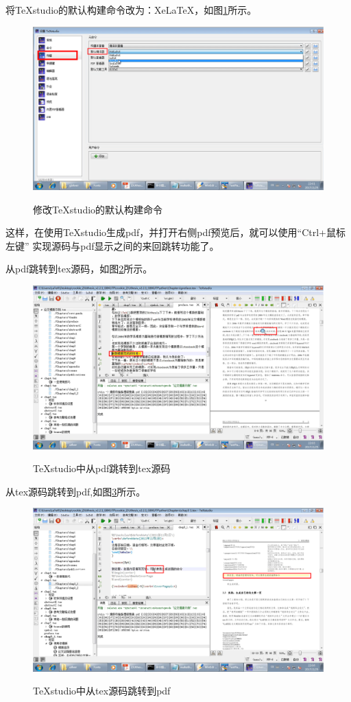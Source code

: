 将TeXstudio的默认构建命令改为：XeLaTeX，如图\ref{Construct}所示。

\begin{figure}[th]
	\centering
	\includegraphics[width=\textwidth]{./Pictures/Construct.eps}\\
	\caption{修改TeXstudio的默认构建命令}
	\label{Construct}
\end{figure}

这样，在使用TeXstudio生成pdf，并打开右侧pdf预览后，就可以使用“Ctrl+鼠标左键”
实现源码与pdf显示之间的来回跳转功能了。

\newpage

从pdf跳转到tex源码，如图\ref{pdftotex}所示。

\begin{figure}[th]
	\centering
	\includegraphics[width=\textwidth]{./Pictures/pdftotex.eps}\\
	\caption{TeXstudio中从pdf跳转到tex源码}
	\label{pdftotex}
\end{figure}

从tex源码跳转到pdf,如图\ref{textopdf}所示。

\begin{figure}[th]
	\centering
	\includegraphics[width=\textwidth]{./Pictures/textopdf.eps}\\
	\caption{TeXstudio中从tex源码跳转到pdf}
	\label{textopdf}
\end{figure}